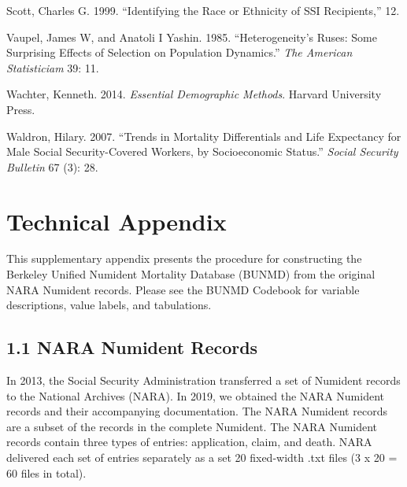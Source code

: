 \documentclass[
  11pt,
]{article}
\newlength{\cslhangindent}
\newlength{\cslentryspacingunit} %
\newenvironment{CSLReferences}[2] %
 {%
  \setlength{\parindent}{0pt}
  \ifodd #1
  \let\oldpar\par
  \def\par{\hangindent=\cslhangindent\oldpar}
  \fi
  \setlength{\parskip}{#2\cslentryspacingunit}
 }%
 {}
\begin{document}
\begin{CSLReferences}{1}{0}
\leavevmode{}%
Scott, Charles G. 1999. {``Identifying the {Race} or {Ethnicity} of
{SSI} {Recipients},''} 12.

\leavevmode{}%
Vaupel, James W, and Anatoli I Yashin. 1985. {``Heterogeneity's {Ruses}:
{Some} {Surprising} {Effects} of {Selection} on {Population}
{Dynamics}.''} \emph{The American Statisticiam} 39: 11.

\leavevmode{}%
Wachter, Kenneth. 2014. \emph{Essential {Demographic} {Methods}}.
Harvard University Press.

\leavevmode{}%
Waldron, Hilary. 2007. {``Trends in {Mortality} {Differentials} and
{Life} {Expectancy} for {Male} {Social} {Security}-{Covered} {Workers},
by {Socioeconomic} {Status}.''} \emph{Social Security Bulletin} 67 (3):
28.

\end{CSLReferences}

\newpage

\hypertarget{technical-appendix}{%
\section{Technical Appendix}\label{technical-appendix}}

This supplementary appendix presents the procedure for constructing the
Berkeley Unified Numident Mortality Database (BUNMD) from the original
NARA Numident records. Please see the BUNMD Codebook for variable
descriptions, value labels, and tabulations.

\hypertarget{nara-numident-records}{%
\subsection{1.1 NARA Numident Records}\label{nara-numident-records}}

In 2013, the Social Security Administration transferred a set of
Numident records to the National Archives (NARA). In 2019, we obtained
the NARA Numident records and their accompanying documentation. The NARA
Numident records are a subset of the records in the complete Numident.
The NARA Numident records contain three types of entries: application,
claim, and death. NARA delivered each set of entries separately as a set
20 fixed-width .txt files (3 x 20 = 60 files in total).
\end{document}
